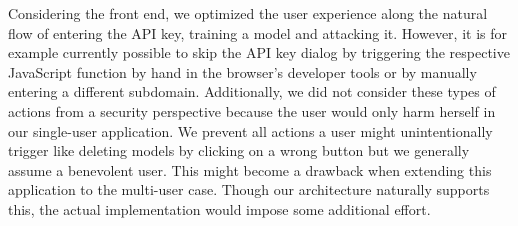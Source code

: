 Considering the front end, we optimized the user experience along the natural flow of entering the API key, training a model and attacking it.
However, it is for example currently possible to skip the API key dialog by triggering the respective JavaScript function by hand in the browser's developer tools or by manually entering a different subdomain.
Additionally, we did not consider these types of actions from a security perspective because the user would only harm herself in our single-user application.
We prevent all actions a user might unintentionally trigger like deleting models by clicking on a wrong button but we generally assume a benevolent user.
This might become a drawback when extending this application to the multi-user case.
Though our architecture naturally supports this, the actual implementation would impose some additional effort.
